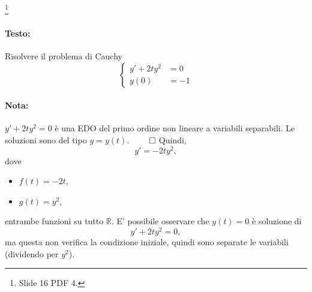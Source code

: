 \begin{example}\footnote{Slide 16 PDF 4.}
    \paragraph{Testo:} Risolvere il problema di Cauchy
    \begin{equation*}
        \begin{cases}
            y' + 2t y^2 &= 0\\
            y(0) &= -1
        \end{cases}
    \end{equation*}
    \paragraph{Nota:} $y' + 2t y^2 = 0$ è una EDO del primo ordine non lineare a variabili separabili. Le soluzioni sono del tipo $y=y(t)$. $\qed$
    Quindi,
    \begin{equation*}
        y' = -2 t y^2,
    \end{equation*}
    dove
    \begin{itemize}
        \item $f(t) = -2t$,
        \item $g(t) = y^2$,
    \end{itemize}
    entrambe funzioni su tutto $\mathbb R$. E' possibile osservare che $y(t)=0$ è soluzione di
    \begin{equation*}
        y' + 2ty^2 = 0,
    \end{equation*}
    ma questa non verifica la condizione iniziale, quindi sono separate le variabili (dividendo per $y^2$).

\end{example}
